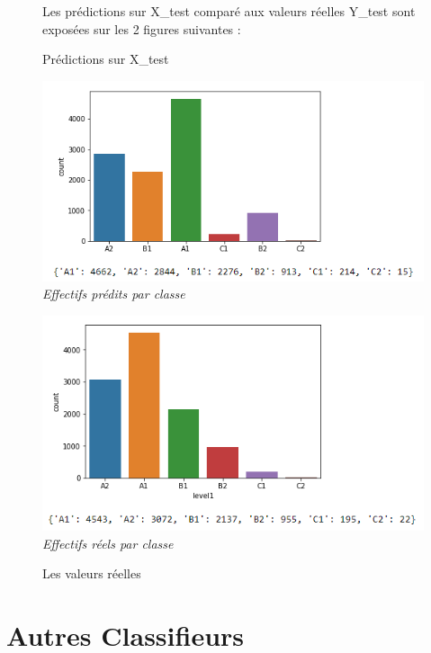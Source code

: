 \documentclass[11pt]{article}
\begin{document}
\begin{figure}[!htb]
Les prédictions sur X\_test comparé aux valeurs réelles Y\_test sont exposées sur les 2 figures suivantes : \\
  \centering
    \caption{Prédictions sur X\_test}
    \includegraphics[width=\textwidth]{predictions.png}
	\textit {Effectifs prédits par classe}
\newline \newline

  \centering
    \caption{Les valeurs réelles}
    \includegraphics[width=\textwidth]{relles.png}
	\textit {Effectifs réels par classe}

\end{figure}

\section{Autres Classifieurs}
\end{document}
